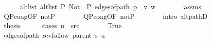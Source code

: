 \begin{isabellebody}
\ \ \ \ \isamarkupfalse%
\ alt{\isacharunderscore}{\kern0pt}list{\isacharcolon}{\kern0pt}\ {\isachardoublequoteopen}alt{\isacharunderscore}{\kern0pt}list\ P{\isacharprime}{\kern0pt}{\isacharprime}{\kern0pt}\ {\isacharparenleft}{\kern0pt}Not\ {\isasymcirc}\ P{\isacharprime}{\kern0pt}{\isacharprime}{\kern0pt}{\isacharparenright}{\kern0pt}\ {\isacharparenleft}{\kern0pt}edges{\isacharunderscore}{\kern0pt}of{\isacharunderscore}{\kern0pt}path\ {\isacharparenleft}{\kern0pt}p\ {\isacharat}{\kern0pt}\ {\isacharbrackleft}{\kern0pt}v{\isacharcomma}{\kern0pt}\ w{\isacharbrackright}{\kern0pt}{\isacharparenright}{\kern0pt}{\isacharparenright}{\kern0pt}{\isachardoublequoteclose}\isanewline
\ \ \ \ \ \ \isamarkupfalse%
\ assms{\isacharparenleft}{\kern0pt}{}{\isacharparenright}{\kern0pt}\isanewline
\ \ \ \ \ \ \isamarkupfalse%
\ Q{\isacharunderscore}{\kern0pt}P{\isacharprime}{\kern0pt}{\isacharprime}{\kern0pt}{\isacharunderscore}{\kern0pt}cong{\isacharunderscore}{\kern0pt}{}{\isacharparenleft}{\kern0pt}{}{\isacharparenright}{\kern0pt}{\isacharbrackleft}{\kern0pt}OF\ not{\isacharunderscore}{\kern0pt}P{\isacharprime}{\kern0pt}{\isacharbrackright}{\kern0pt}\isanewline
\ \ \ \ \ \ \isamarkupfalse%
\ Q{\isacharunderscore}{\kern0pt}P{\isacharprime}{\kern0pt}{\isacharprime}{\kern0pt}{\isacharunderscore}{\kern0pt}cong{\isacharunderscore}{\kern0pt}{}{\isacharparenleft}{\kern0pt}{}{\isacharparenright}{\kern0pt}{\isacharbrackleft}{\kern0pt}OF\ not{\isacharunderscore}{\kern0pt}P{\isacharprime}{\kern0pt}{\isacharbrackright}{\kern0pt}\isanewline
\ \ \ \ \ \ \isamarkupfalse%
\ {\isacharparenleft}{\kern0pt}intro\ alt{\isacharunderscore}{\kern0pt}pathD{\isacharparenleft}{\kern0pt}{}{\isacharparenright}{\kern0pt}{\isacharparenright}{\kern0pt}\isanewline
\ \ \ \ \isamarkupfalse%
\ {\isacharquery}{\kern0pt}thesis\isanewline
\ \ \ \ \isamarkupfalse%
\ {\isacharparenleft}{\kern0pt}cases\ {\isachardoublequoteopen}u\ {\isacharequal}{\kern0pt}\ src{\isachardoublequoteclose}{\isacharparenright}{\kern0pt}\isanewline
\ \ \ \ \ \ \isamarkupfalse%
\ True\isanewline
\ \ \ \ \ \ \isamarkupfalse%
\ {\isachardoublequoteopen}edges{\isacharunderscore}{\kern0pt}of{\isacharunderscore}{\kern0pt}path\ {\isacharparenleft}{\kern0pt}rev{\isacharunderscore}{\kern0pt}follow\ {\isacharparenleft}{\kern0pt}parent\ s{\isacharparenright}{\kern0pt}\ u{\isacharparenright}{\kern0pt}\ {\isacharequal}{\kern0pt}\ {\isacharbrackleft}{\kern0pt}{\isacharbrackright}{\kern0pt}{\isachardoublequoteclose}\isanewline

\end{isabellebody}
